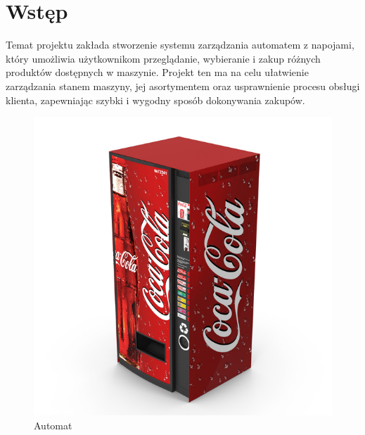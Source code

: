 ﻿\chapter*{Wstęp}

Temat projektu zakłada stworzenie systemu zarządzania automatem z napojami, który umożliwia użytkownikom przeglądanie, wybieranie i zakup różnych produktów dostępnych w maszynie. Projekt ten ma na celu ułatwienie zarządzania stanem maszyny, jej asortymentem oraz usprawnienie procesu obsługi klienta, zapewniając szybki i wygodny sposób dokonywania zakupów.

\begin{figure}[!ht]
\centering
\includegraphics[width=16cm]{grafiki/automat.jpg}
    \caption{\footnotesize Automat \cite{www-1}}
\end{figure}

